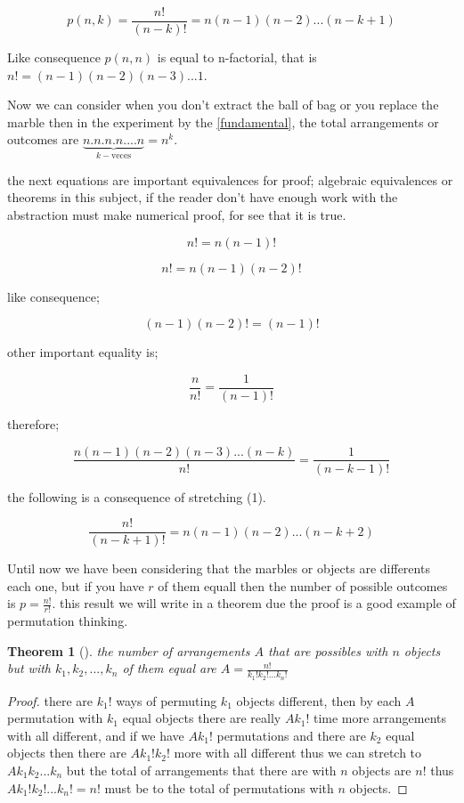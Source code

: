 \documentclass[10pt,a4paper]{article}
\newtheorem{theorem}{Theorem}[section]
\begin{document}
 
\begin{equation}
\label{permutation}
p(n,k)= \frac{n!}{(n-k)!}=n(n-1)(n-2)...(n-k+1)
\end{equation}





Like consequence $p(n,n)$ is equal to  n-factorial, that is $n!=(n-1)(n-2)(n-3)...1$. 

Now we can consider when you don't extract the ball of bag or you replace the marble then in the experiment by the \ref{fundamental},  the total arrangements or outcomes are 
$
\underbrace{n.n.n.n....n}_{k            - \mbox{veces}} = n^{k} $.

the next equations are important equivalences for proof; algebraic equivalences or theorems in this subject, if the reader  don't have enough work with the abstraction must make numerical proof,  for see that it is true.


$$n!=n(n-1)!$$ 



$$n!=n(n-1)(n-2)!$$

like consequence;

$$(n-1)(n-2)!=(n-1)!$$

other important equality is; 

$$\frac{n}{n!}=\frac{1}{(n-1)!}$$

therefore;

$$\frac{n(n-1)(n-2)(n-3)...(n-k)}{n!}=\dfrac{1}{(n-k-1)!}$$


the following  is a consequence of stretching (1).


$$ \dfrac{n!}{(n-k+1)!}=n(n-1)(n-2)...(n-k+2)$$


Until now we have been considering that the marbles or objects are differents each one, but if you have $r$ of them equall then the number of possible outcomes is $p=\frac{n!}{r!}$. this result we will write in a theorem due the proof is a good example of permutation thinking.
\begin{theorem}[]

\label{two}
 the number of arrangements $A$ that are possibles with $n$ objects but with  $k_{1}, k_{2},...,k_{n}$ of them equal are $ A =\frac{n!}{k_{1}! k_{2}!...k_{n}!}$
 
\end{theorem}


\begin{proof}
 
 there are $k_{1}!$ ways of permuting $k_{1}$ objects different, then by each $A$ permutation with $k_{1}$ equal objects  there are really $Ak_{1}!$ time more arrangements with all different, and if we have $Ak_{1}!$ permutations and  there are $k_{2}$ equal objects then there are $Ak_{1}!k_{2}!$ more with all different thus we can stretch to $Ak_{1}k_{2}...k_{n}$ but the total of arrangements that there are with $n$ objects are $n!$ thus $Ak_{1}!k_{2}!...k_{n}!=n!$ must be to the total of permutations with $n$ objects.

\end{proof}
\end{document}
